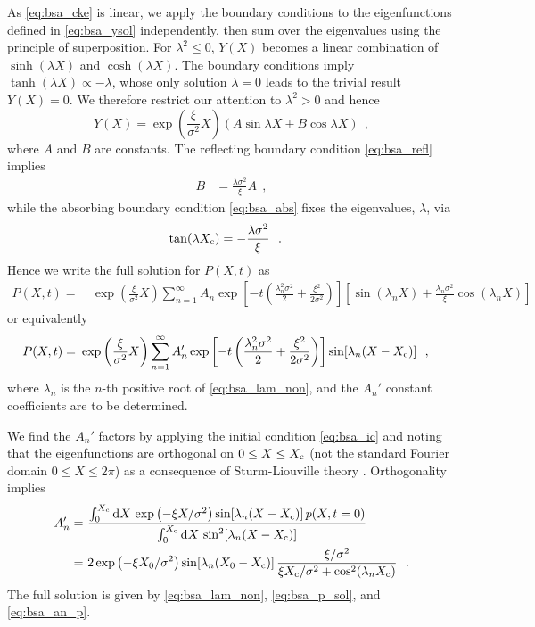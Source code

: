 \begin{subappendices}
As \eqref{eq:bsa_cke} is linear, we apply the boundary conditions to the eigenfunctions defined in \eqref{eq:bsa_ysol} independently, then sum over the eigenvalues using the principle of superposition. For $\lambda^2 \leq 0$, $Y(X)$ becomes a linear combination of $\sinh(\lambda X)$ and $\cosh(\lambda X)$. The boundary conditions imply $\tanh(\lambda X) \propto -\lambda$, whose only solution $\lambda = 0$ leads to the trivial result $Y(X) = 0$. We therefore restrict our attention to $\lambda^2 > 0$ and hence
\begin{equation}
Y(X) = \exp\left(\frac{\xi}{\sigma^2}X\right) \left(A \sin\lambda X + B \cos\lambda X \right)\ \ ,
\end{equation}
where $A$ and $B$ are constants. The reflecting boundary condition \eqref{eq:bsa_refl} implies
\begin{align}
B &= \frac{\lambda \sigma^2}{\xi} A\ \ ,
\end{align}
while the absorbing boundary condition \eqref{eq:bsa_abs} fixes the eigenvalues, $\lambda$, via
\begin{align}
\tan(\lambda \xc) &= -\frac{\lambda \sigma^2}{\xi}\ \ .\label{eq:bsa_lam_non}
\end{align}
Hence we write the full solution for $P(X,t)$ as
\begin{align}
P(X,t) = &~\exp\left(\frac{\xi}{\sigma^2}X\right) \sum_{n=1}^\infty A_n \exp \left[-t \left(\frac{\lambda_n^2 \sigma^2}{2} + \frac{\xi^2}{2\sigma^2} \right)\right] \left[\sin(\lambda_n X) + \frac{\lambda_n \sigma^2}{\xi} \cos(\lambda_n X) \right]
\end{align}
or equivalently
\begin{align}
P(X,t) = &~\exp\left(\frac{\xi}{\sigma^2}X\right) \sum_{n=1}^\infty A_n' \exp \left[-t \left(\frac{\lambda_n^2 \sigma^2}{2} + \frac{\xi^2}{2\sigma^2} \right)\right] \sin[\lambda_n (X - X_\textrm{c})]\ \ , \label{eq:bsa_p_sol}
\end{align}
where $\lambda_n$ is the $n$-th positive root of \eqref{eq:bsa_lam_non}, and the $A_n'$ constant coefficients are to be determined.

We find the $A_n'$ factors by applying the initial condition \eqref{eq:bsa_ic} and noting that the eigenfunctions are orthogonal on $0 \leq X \leq X_\textrm{c}$ (not the standard Fourier domain $0 \leq X \leq 2\pi$) as a consequence of Sturm-Liouville theory \citep{Morse1953}. Orthogonality implies
\begin{align}
A_n' = &~\frac{\int_0^{\xc} \td X\, \exp\left(-\xi X / \sigma^2\right)\sin[\lambda_n(X - \xc)]\, p(X, t=0)}{\int_0^{\xc}\td X\, \sin^2[\lambda_n(X - \xc)]}\\
= &~2 \exp\left(-\xi X_0 / \sigma^2\right)\sin[\lambda_n(X_0 - \xc)]\, \frac{\xi/\sigma^2}{\xi \xc / \sigma^2 + \cos^2(\lambda_n \xc)}\ \ .
\label{eq:bsa_an_p}
\end{align}
The full solution is given by \eqref{eq:bsa_lam_non}, \eqref{eq:bsa_p_sol}, and \eqref{eq:bsa_an_p}.


\end{subappendices}
